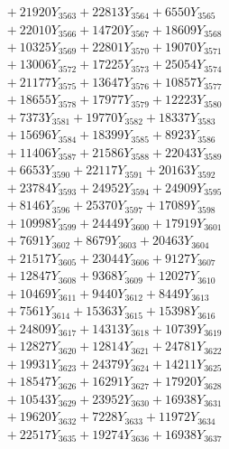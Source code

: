 \documentclass[a4paper,10pt]{article}
\begin{document}
{\begin{align}
&\;  + 21920 Y_{3563} + 22813 Y_{3564} + 6550 Y_{3565} \\[0.3ex]
&\;  + 22010 Y_{3566} + 14720 Y_{3567} + 18609 Y_{3568} \\[0.5ex]\allowbreak
&\;  + 10325 Y_{3569} + 22801 Y_{3570} + 19070 Y_{3571} \\[0.3ex]
&\;  + 13006 Y_{3572} + 17225 Y_{3573} + 25054 Y_{3574} \\[0.3ex]
&\;  + 21177 Y_{3575} + 13647 Y_{3576} + 10857 Y_{3577} \\[0.3ex]
&\;  + 18655 Y_{3578} + 17977 Y_{3579} + 12223 Y_{3580} \\[0.3ex]
&\;  + 7373 Y_{3581} + 19770 Y_{3582} + 18337 Y_{3583} \\[0.3ex]
&\;  + 15696 Y_{3584} + 18399 Y_{3585} + 8923 Y_{3586} \\[0.3ex]
&\;  + 11406 Y_{3587} + 21586 Y_{3588} + 22043 Y_{3589} \\[0.3ex]
&\;  + 6653 Y_{3590} + 22117 Y_{3591} + 20163 Y_{3592} \\[0.3ex]
&\;  + 23784 Y_{3593} + 24952 Y_{3594} + 24909 Y_{3595} \\[0.3ex]
&\;  + 8146 Y_{3596} + 25370 Y_{3597} + 17089 Y_{3598} \\[0.5ex]\allowbreak
&\;  + 10998 Y_{3599} + 24449 Y_{3600} + 17919 Y_{3601} \\[0.3ex]
&\;  + 7691 Y_{3602} + 8679 Y_{3603} + 20463 Y_{3604} \\[0.3ex]
&\;  + 21517 Y_{3605} + 23044 Y_{3606} + 9127 Y_{3607} \\[0.3ex]
&\;  + 12847 Y_{3608} + 9368 Y_{3609} + 12027 Y_{3610} \\[0.3ex]
&\;  + 10469 Y_{3611} + 9440 Y_{3612} + 8449 Y_{3613} \\[0.3ex]
&\;  + 7561 Y_{3614} + 15363 Y_{3615} + 15398 Y_{3616} \\[0.3ex]
&\;  + 24809 Y_{3617} + 14313 Y_{3618} + 10739 Y_{3619} \\[0.3ex]
&\;  + 12827 Y_{3620} + 12814 Y_{3621} + 24781 Y_{3622} \\[0.3ex]
&\;  + 19931 Y_{3623} + 24379 Y_{3624} + 14211 Y_{3625} \\[0.3ex]
&\;  + 18547 Y_{3626} + 16291 Y_{3627} + 17920 Y_{3628} \\[0.5ex]\allowbreak
&\;  + 10543 Y_{3629} + 23952 Y_{3630} + 16938 Y_{3631} \\[0.3ex]
&\;  + 19620 Y_{3632} + 7228 Y_{3633} + 11972 Y_{3634} \\[0.3ex]
&\;  + 22517 Y_{3635} + 19274 Y_{3636} + 16938 Y_{3637} \\[0.3ex]

\end{align}}
\end{document}
